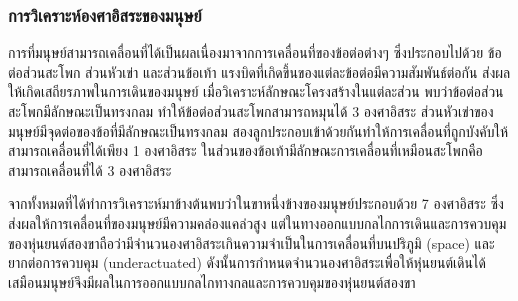 \clearpage
\subsubsection{การวิเคราะห์องศาอิสระของมนุษย์}
การที่มนุษย์สามารถเคลื่อนที่ได้เป็นผลเนื่องมาจากการเคลื่อนที่ของข้อต่อต่างๆ ซึ่งประกอบไปด้วย ข้อต่อส่วนสะโพก ส่วนหัวเข่า และส่วนข้อเท้า
แรงบิดที่เกิดขึ้นของแต่ละข้อต่อมีความสัมพันธ์ต่อกัน ส่งผลให้เกิดเสถียรภาพในการเดินของมนุษย์
เมื่อวิเคราะห์ลักษณะโครงสร้างในแต่ละส่วน พบว่าข้อต่อส่วนสะโพกมีลักษณะเป็นทรงกลม 
ทำให้ข้อต่อส่วนสะโพกสามารถหมุนได้ 3 องศาอิสระ ส่วนหัวเข่าของมนุษย์มีจุดต่อของข้อที่มีลักษณะเป็นทรงกลม
สองลูกประกอบเข้าด้วยกันทำให้การเคลื่อนที่ถูกบังคับให้สามารถเคลื่อนที่ได้เพียง 1 องศาอิสระ
ในส่วนของข้อเท้ามีลักษณะการเคลื่อนที่เหมือนสะโพกคือสามารถเคลื่อนที่ได้ 3 องศาอิสระ

จากทั้งหมดที่ได้ทำการวิเคราะห์มาข้างต้นพบว่าในขาหนึ่งข้างของมนุษย์ประกอบด้วย 7 องศาอิสระ
ซึ่งส่งผลให้การเคลื่อนที่ของมนุษย์มีความคล่องแคล่วสูง แต่ในทางออกแบบกลไกการเดินและการควบคุม
ของหุ่นยนต์สองขาถือว่ามีจำนวนองศาอิสระเกินความจำเป็นในการเคลื่อนที่บนปริภูมิ (space) และยากต่อการควบคุม
(underactuated) ดังนั้นการกำหนดจำนวนองศาอิสระเพื่อให้หุ่นยนต์เดินได้เสมือนมนุษย์จึงมีผลในการออกแบบกลไกทางกลและการควบคุมของหุ่นยนต์สองขา 


